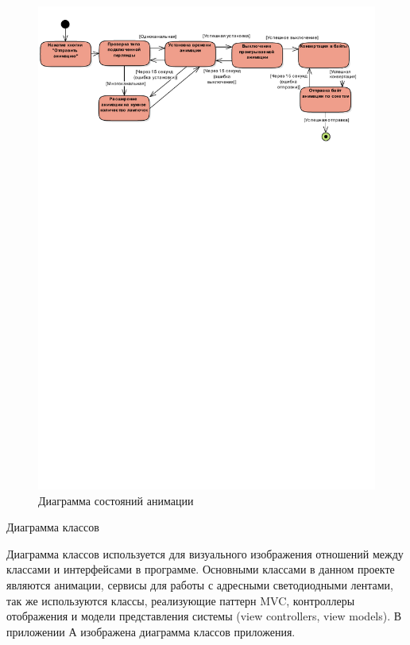 ~
\begin{figure}[H]
\centering
	\includegraphics[scale=0.9]{figures/diagrams/uml_state.pdf}
	\caption{Диаграмма состояний анимации}
	\label{fig:develop:umlDiagrams:state}
\end{figure}

Диаграмма классов

Диаграмма классов используется для визуального изображения отношений между классами и интерфейсами в программе. Основными классами в данном проекте являются анимации, сервисы для работы с адресными светодиодными лентами, так же используются классы, реализующие паттерн MVC, контроллеры отображения и модели представления системы (view controllers, view models). В приложении А изображена диаграмма классов приложения.
